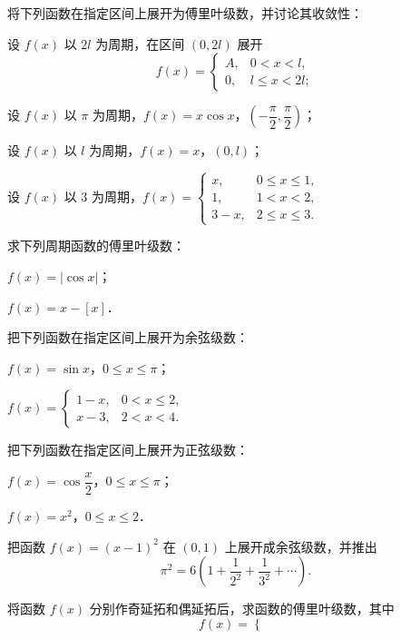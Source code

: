 \begin{xiti}
\item 将下列函数在指定区间上展开为傅里叶级数，并讨论其收敛性：
\begin{ziti}
\item 设 $f(x)$ 以 $2l$ 为周期，在区间 $(0,2l)$ 展开
\[
f(x)=\begin{cases}
A, & 0<x<l,\\
0, & l\leqslant x<2l;
\end{cases}
\]
\item 设 $f(x)$ 以 $\pi$ 为周期，$f(x)=x\cos x$，$\left(-\dfrac{\pi}{2},\dfrac{\pi}{2}\right)$；
\item 设 $f(x)$ 以 $l$ 为周期，$f(x)=x$，$(0,l)$；
\item 设 $f(x)$ 以 $3$ 为周期，$f(x)=\begin{cases}x,&0\leqslant x\leqslant 1,\\ 1,&1<x<2,\\ 3-x,&2\leqslant x\leqslant 3.\end{cases}$
\end{ziti}
\item 求下列周期函数的傅里叶级数：
\begin{ziti}
\item $f(x)=\left|\cos x\right|$；
\item $f(x)=x-[x]$．
\end{ziti}
\item 把下列函数在指定区间上展开为余弦级数：
\begin{ziti}
\item $f(x)=\sin x$，$0\leqslant x\leqslant\pi$；
\item $f(x)=\begin{cases}1-x,&0<x\leqslant 2,\\ x-3,&2<x<4.\end{cases}$
\end{ziti}
\item 把下列函数在指定区间上展开为正弦级数：
\begin{ziti}
\item $f(x)=\cos\dfrac{x}{2}$，$0\leqslant x\leqslant\pi$；
\item $f(x)=x^{2}$，$0\leqslant x\leqslant 2$．
\end{ziti}
\item 把函数 $f(x)=(x-1)^{2}$ 在 $(0,1)$ 上展开成余弦级数，并推出
\[
\pi^{2}=6\left(1+\frac{1}{2^{2}}+\frac{1}{3^{2}}+\cdots\right).
\]
\item 将函数 $f(x)$ 分别作奇延拓和偶延拓后，求函数的傅里叶级数，其中
\[
f(x)=\begin{cases}

\end{cases}\]
\end{xiti}
